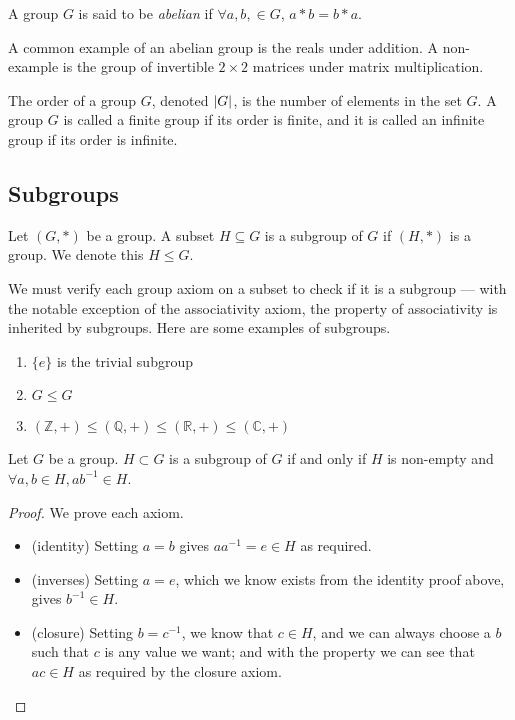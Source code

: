 \begin{definition}
	A group \(G\) is said to be \textit{abelian} if \(\forall a, b, \in G\), \(a \ast b = b \ast a\).
\end{definition}
A common example of an abelian group is the reals under addition.
A non-example is the group of invertible \(2\times 2\) matrices under matrix multiplication.

\begin{definition}
	The order of a group \(G\), denoted \(\abs{G}\), is the number of elements in the set \(G\).
	A group \(G\) is called a finite group if its order is finite, and it is called an infinite group if its order is infinite.
\end{definition}

\subsection{Subgroups}
\begin{definition}
	Let \((G, \ast)\) be a group.
	A subset \(H \subseteq G\) is a subgroup of \(G\) if \((H, \ast)\) is a group.
	We denote this \(H \leq G\).
\end{definition}
We must verify each group axiom on a subset to check if it is a subgroup --- with the notable exception of the associativity axiom, the property of associativity is inherited by subgroups.
Here are some examples of subgroups.

\begin{enumerate}
	\item \(\{ e \}\) is the trivial subgroup
	\item \(G \leq G\)
	\item \((\mathbb Z, +) \leq (\mathbb Q, +) \leq (\mathbb R, +) \leq (\mathbb C, +)\)
\end{enumerate}
\begin{lemma}
	Let \(G\) be a group.
	\(H \subset G\) is a subgroup of \(G\) if and only if \(H\) is non-empty and \(\forall a, b \in H, ab^{-1} \in H\).
\end{lemma}
\begin{proof}
	We prove each axiom.
	\begin{itemize}
		\item (identity) Setting \(a = b\) gives \(a a^{-1} = e \in H\) as required.
		\item (inverses) Setting \(a = e\), which we know exists from the identity proof above, gives \(b^{-1} \in H\).
		\item (closure) Setting \(b = c^{-1}\), we know that \(c \in H\), and we can always choose a \(b\) such that \(c\) is any value we want; and with the property we can see that \(ac \in H\) as required by the closure axiom.
	\end{itemize}
\end{proof}

